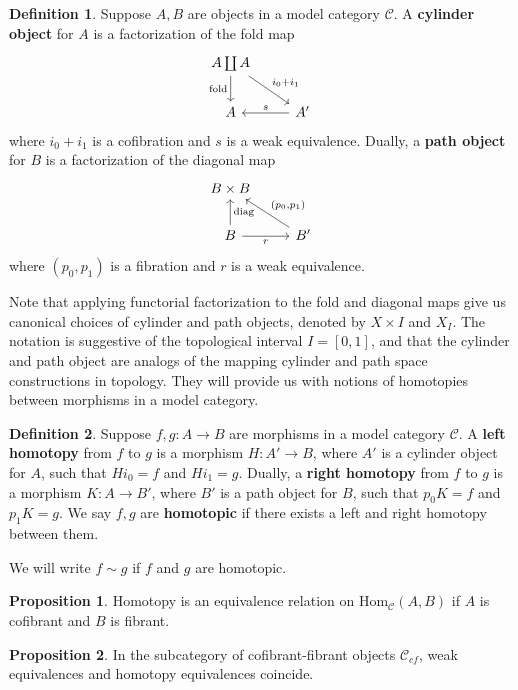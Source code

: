 \documentclass{article}
\newcommand{\Hom}{\textrm{Hom}}
\theoremstyle{definition}
\theoremstyle{definition}
\newtheorem{definition}{Definition}[theorem]
\theoremstyle{definition}
\theoremstyle{definition}
\newtheorem{proposition}{Proposition}[theorem]
\theoremstyle{definition}
\theoremstyle{definition}
\theoremstyle{definition}
\begin{document}
\begin{definition}
	Suppose $A,B$ are objects in a model category $\mathcal{C}$. A \textbf{cylinder object} for $A$ is a factorization of the fold map 
	\[\begin{tikzcd}
		{A\coprod A} \\
		A & {A'}
		\arrow["{\textrm{fold}}"', from=1-1, to=2-1]
		\arrow["i_0+i_1", from=1-1, to=2-2]
		\arrow["s"', from=2-2, to=2-1]
	\end{tikzcd}\]
	where $i_0+i_1$ is a cofibration and $s$ is a weak equivalence. Dually, a \textbf{path object} for $B$ is a factorization of the diagonal map
	\[\begin{tikzcd}
		{B\times B} \\
		B & {B'}
		\arrow["{\textrm{diag}}"', from=2-1, to=1-1]
		\arrow["r"', from=2-1, to=2-2]
		\arrow["{(p_0,p_1)}"', from=2-2, to=1-1]
	\end{tikzcd}\]
	where $(p_0,p_1)$ is a fibration and $r$ is a weak equivalence. 
\end{definition}
Note that applying functorial factorization to the fold and diagonal maps give us canonical choices of cylinder and path objects, denoted by $X\times I$ and $X_I$. The notation is suggestive of the topological interval $I=[0,1]$, and that the cylinder and path object are analogs of the mapping cylinder and path space constructions in topology. They will provide us with notions of homotopies between morphisms in a model category.
\begin{definition}
	Suppose $f,g: A\to B$ are morphisms in a model category $\mathcal{C}$. A \textbf{left homotopy} from $f$ to $g$ is a morphism $H: A'\to B$, where $A'$ is a cylinder object for $A$, such that $Hi_0=f$ and $Hi_1=g$. Dually, a \textbf{right homotopy} from $f$ to $g$ is a morphism $K: A\to B'$, where $B'$ is a path object for $B$, such that $p_0 K=f$ and $p_1 K=g$. We say $f,g$ are \textbf{homotopic} if there exists a left and right homotopy between them. 
\end{definition}
We will write $f\sim g$ if $f$ and $g$ are homotopic. 

\begin{proposition}
	Homotopy is an equivalence relation on $\Hom_{\mathcal{C}}(A,B)$ if $A$ is cofibrant and $B$ is fibrant.
\end{proposition}

\begin{proposition}
	In the subcategory of cofibrant-fibrant objects $\mathcal{C}_{cf}$, weak equivalences and homotopy equivalences coincide.
\end{proposition}
\end{document}

